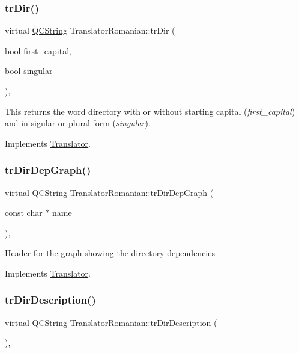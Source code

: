 \subsubsection{\texorpdfstring{trDir()}{trDir()}}
{\footnotesize\ttfamily virtual \mbox{\hyperlink{class_q_c_string}{Q\+C\+String}} Translator\+Romanian\+::tr\+Dir (\begin{DoxyParamCaption}\item[{bool}]{first\+\_\+capital,  }\item[{bool}]{singular }\end{DoxyParamCaption})\hspace{0.3cm}{\ttfamily [inline]}, {\ttfamily [virtual]}}

This returns the word directory with or without starting capital ({\itshape first\+\_\+capital}) and in sigular or plural form ({\itshape singular}). 

Implements \mbox{\hyperlink{class_translator}{Translator}}.

\mbox{\label{class_translator_romanian_a94afd9a96519bc9465fa2ad04e938295}} 
\subsubsection{\texorpdfstring{trDirDepGraph()}{trDirDepGraph()}}
{\footnotesize\ttfamily virtual \mbox{\hyperlink{class_q_c_string}{Q\+C\+String}} Translator\+Romanian\+::tr\+Dir\+Dep\+Graph (\begin{DoxyParamCaption}\item[{const char $\ast$}]{name }\end{DoxyParamCaption})\hspace{0.3cm}{\ttfamily [inline]}, {\ttfamily [virtual]}}

Header for the graph showing the directory dependencies 

Implements \mbox{\hyperlink{class_translator}{Translator}}.

\mbox{\label{class_translator_romanian_a704f7e7ff88ef729c57e9d050fb2e6be}} 
\subsubsection{\texorpdfstring{trDirDescription()}{trDirDescription()}}
{\footnotesize\ttfamily virtual \mbox{\hyperlink{class_q_c_string}{Q\+C\+String}} Translator\+Romanian\+::tr\+Dir\+Description (\begin{DoxyParamCaption}{ }\end{DoxyParamCaption})\hspace{0.3cm}{\ttfamily [inline]}, {\ttfamily [virtual]}}

